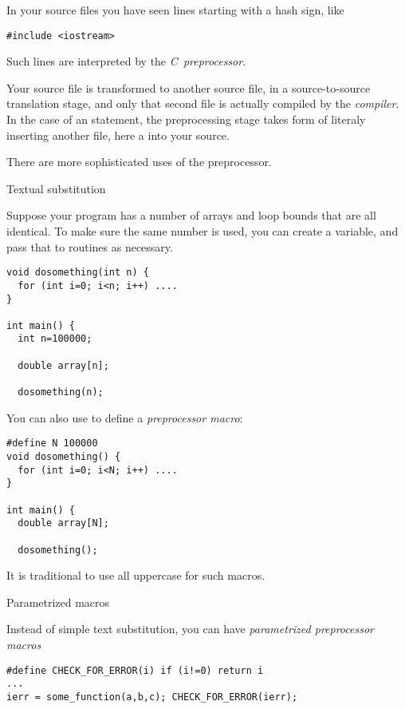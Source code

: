 
In your source files you have seen lines starting with a hash sign,
like
\begin{lstlisting}
#include <iostream>
\end{lstlisting}
Such lines are interpreted by the
%
\emph{C~preprocessor}.

Your source file is transformed to another source file, in a
source-to-source translation stage, and only that second file is
actually compiled by the
%
\emph{compiler}.
In the case of an  statement, the preprocessing stage
takes form of literaly inserting another file, here a
%
into your source.

There are more sophisticated uses of the preprocessor.

 {Textual substitution}

Suppose your program has a number of arrays and loop bounds that are
all identical. To make sure the same number is used, you can create a
variable, and pass that to routines as necessary.
\begin{lstlisting}
void dosomething(int n) {
  for (int i=0; i<n; i++) ....
}

int main() {
  int n=100000;

  double array[n];
   
  dosomething(n);
\end{lstlisting}
You can also use  to define a
\emph{preprocessor macro}:
\begin{lstlisting}
#define N 100000
void dosomething() {
  for (int i=0; i<N; i++) ....
}

int main() {
  double array[N];
   
  dosomething();
\end{lstlisting}
It is traditional to use all uppercase for such macros.

 {Parametrized macros}
\label{sec:cpp-define-fun}

Instead of simple text substitution, you can have
%
\emph{parametrized preprocessor macros}
\begin{lstlisting}
#define CHECK_FOR_ERROR(i) if (i!=0) return i
...
ierr = some_function(a,b,c); CHECK_FOR_ERROR(ierr);
\end{lstlisting}

